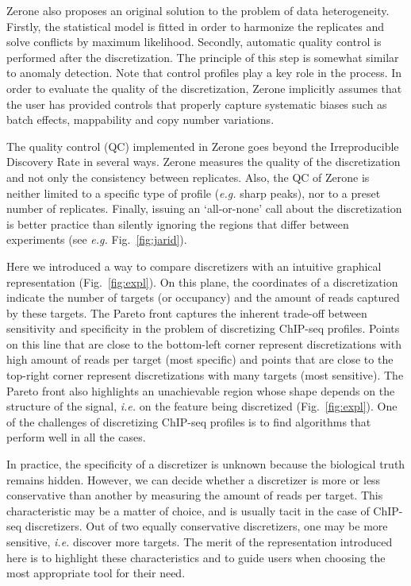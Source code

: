 \documentclass{bioinfo}
\begin{document}
Zerone also proposes an original solution to the problem of
data heterogeneity. Firstly, the statistical model is fitted
in order to harmonize the replicates and solve conflicts by maximum
likelihood. Secondly, automatic quality control is performed
after the discretization. The principle of this step is somewhat
similar to anomaly detection. Note that control profiles play a key
role in the process. In order to evaluate the quality of the
discretization, Zerone implicitly assumes that the user
has provided controls that properly capture systematic biases
such as batch effects, mappability and copy number variations.

The quality control (QC) implemented in Zerone goes beyond the
Irreproducible Discovery Rate \citep[IDR,][]{li2011} in several
ways. Zerone measures the quality of the discretization and not only
the consistency between replicates. Also, the QC of Zerone is neither
limited to a specific type of profile (\textit{e.g.} sharp peaks),
nor to a preset number of replicates. Finally, issuing an
`all-or-none' call about the discretization is better practice
than silently ignoring the regions that differ between experiments
(see \textit{e.g.} Fig.~\ref{fig:jarid}).

Here we introduced a way to compare discretizers with an intuitive
graphical representation (Fig.~\ref{fig:expl}). On this plane,
the coordinates of a discretization indicate the number of targets
(or occupancy) and the amount of reads captured by these targets.
The Pareto front captures the inherent trade-off between sensitivity
and specificity in the problem of discretizing ChIP-seq profiles.
Points on this line that are close to the bottom-left corner represent
discretizations with high amount of reads per target (most specific)
and points that are close to the top-right corner represent
discretizations with many targets (most sensitive). The Pareto front
also highlights an unachievable region whose shape depends on the
structure of the signal, \textit{i.e.} on the feature being discretized
(Fig.~\ref{fig:expl}). One of the challenges of discretizing ChIP-seq
profiles is to find algorithms that perform well in all the cases.

In practice, the specificity of a discretizer is unknown because
the biological truth remains hidden. However, we can decide whether
a discretizer is more or less conservative than another by measuring
the amount of reads per target. This characteristic may be a matter of
choice, and is usually tacit in the case of ChIP-seq discretizers.
Out of two equally conservative discretizers, one may be more sensitive,
\textit{i.e.} discover more targets. The merit of the representation
introduced here is to highlight these characteristics and to guide users
when choosing the most appropriate tool for their need.
\end{document}
